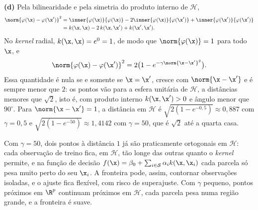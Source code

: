 \begin{solucao}
\smallskip
\textbf{(d)} Pela bilinearidade e pela simetria do produto interno de $\mathcal H$,
\begin{align*}
  \norm{\varphi(\x)-\varphi(\x')}^2
  &=\inner{\varphi(\x)}{\varphi(\x)}-2\inner{\varphi(\x)}{\varphi(\x')}+\inner{\varphi(\x')}{\varphi(\x')}\\
  &=k(\x,\x)-2\,k(\x,\x')+k(\x',\x') .
\end{align*}
No \emph{kernel} radial, $k(\x,\x)=e^0=1$, de modo que $\norm{\varphi(\x)}=1$ para todo $\x$,
e
\[
  \norm{\varphi(\x)-\varphi(\x')}^2=2\big(1-e^{-\gamma\norm{\x-\x'}^2}\big) .
\]
Essa quantidade é nula se e somente se $\x=\x'$, cresce com $\norm{\x-\x'}$ e é sempre menor
que $2$: os pontos vão para a esfera unitária de $\mathcal H$, a distâncias menores que
$\sqrt2$, isto é, com produto interno $k(\x,\x')>0$ e ângulo menor que $90^\circ$. Para
$\norm{\x-\x'}=1$, a distância em $\mathcal H$ é $\sqrt{2(1-e^{-0{,}5})}\approx0{,}887$ com
$\gamma=0{,}5$ e $\sqrt{2(1-e^{-50})}\approx1{,}4142$ com $\gamma=50$, que é $\sqrt2$ até a
quarta casa.

Com $\gamma=50$, dois pontos à distância $1$ já são praticamente ortogonais em $\mathcal H$:
cada observação de treino fica, em $\mathcal H$, tão longe das outras quanto o
\emph{kernel} permite, e na função de decisão $f(\x)=\beta_0+\sum_{i\in\mathcal S}\alpha_ik(\x,\x_i)$
cada parcela só pesa muito perto do seu $\x_i$. A fronteira pode, assim, contornar
observações isoladas, e o ajuste fica flexível, com risco de superajuste. Com $\gamma$
pequeno, pontos próximos em $\R^p$ continuam próximos em $\mathcal H$, cada parcela pesa
numa região grande, e a fronteira é suave.
\end{solucao}
